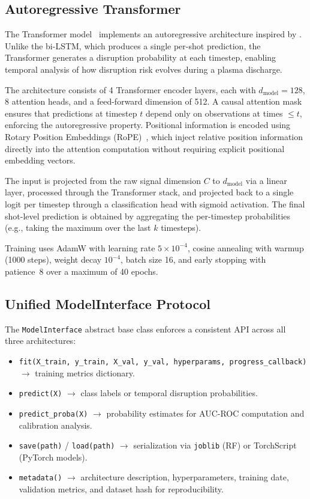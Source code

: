 \documentclass[twocolumn]{article}
\begin{document}
\subsection{Autoregressive Transformer}
\label{sec:transformer}

The Transformer model~\citep{vaswani2017} implements an
autoregressive architecture inspired by \citet{spangher2024}.
Unlike the bi-LSTM, which produces a single per-shot prediction,
the Transformer generates a disruption probability at each
timestep, enabling temporal analysis of how disruption risk
evolves during a plasma discharge.

The architecture consists of 4 Transformer encoder layers,
each with $d_{\text{model}} = 128$, 8 attention heads, and
a feed-forward dimension of 512.
A causal attention mask ensures that predictions at timestep
$t$ depend only on observations at times $\leq t$, enforcing
the autoregressive property.
Positional information is encoded using Rotary Position
Embeddings (RoPE)~\citep{su2024}, which inject relative
position information directly into the attention computation
without requiring explicit positional embedding vectors.

The input is projected from the raw signal dimension $C$
to $d_{\text{model}}$ via a linear layer, processed through
the Transformer stack, and projected back to a single logit
per timestep through a classification head with sigmoid
activation.
The final shot-level prediction is obtained by aggregating
the per-timestep probabilities (e.g., taking the maximum
over the last $k$ timesteps).

Training uses AdamW with learning rate $5 \times 10^{-4}$,
cosine annealing with warmup (1000 steps), weight decay
$10^{-4}$, batch size 16, and early stopping with patience~8
over a maximum of 40 epochs.

\subsection{Unified ModelInterface Protocol}

The \texttt{ModelInterface} abstract base class enforces a
consistent API across all three architectures:

\begin{itemize}[noitemsep]
  \item \texttt{fit(X\_train, y\_train, X\_val, y\_val,
        hyperparams, progress\_callback)} $\to$ training
        metrics dictionary.
  \item \texttt{predict(X)} $\to$ class labels or temporal
        disruption probabilities.
  \item \texttt{predict\_proba(X)} $\to$ probability estimates
        for AUC-ROC computation and calibration analysis.
  \item \texttt{save(path)} / \texttt{load(path)} $\to$
        serialization via \texttt{joblib} (RF) or TorchScript
        (PyTorch models).
  \item \texttt{metadata()} $\to$ architecture description,
        hyperparameters, training date, validation metrics,
        and dataset hash for reproducibility.
\end{itemize}
\end{document}
